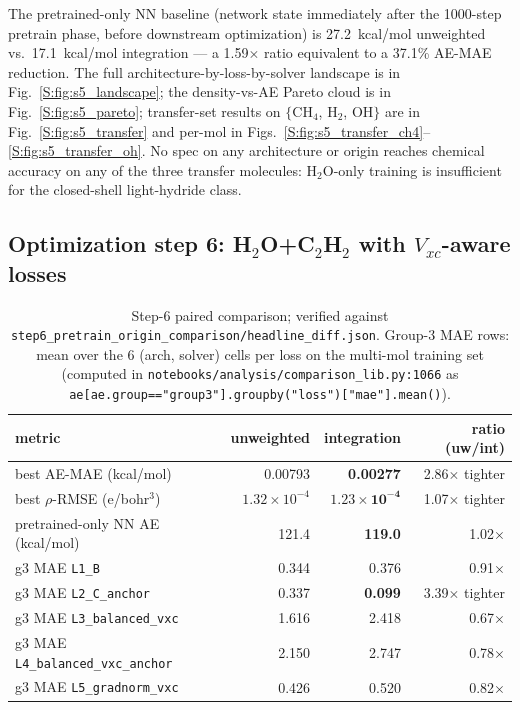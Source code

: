 \documentclass[11pt,letterpaper]{article}
\begin{document}
The pretrained-only NN baseline (network state immediately after the
1000-step pretrain phase, before downstream optimization) is 27.2~kcal/mol
unweighted vs.\ 17.1~kcal/mol integration --- a 1.59$\times$ ratio
equivalent to a 37.1\% AE-MAE reduction. The full architecture-by-loss-by-solver
landscape is in Fig.~\ref{S:fig:s5_landscape}; the density-vs-AE Pareto
cloud is in Fig.~\ref{S:fig:s5_pareto}; transfer-set results on
$\{$CH$_4$, H$_2$, OH$\}$ are in Fig.~\ref{S:fig:s5_transfer} and per-mol
in Figs.~\ref{S:fig:s5_transfer_ch4}--\ref{S:fig:s5_transfer_oh}. No spec
on any architecture or origin reaches chemical accuracy on any of the
three transfer molecules: H$_2$O-only training is insufficient for the
closed-shell light-hydride class.

\subsection{Optimization step 6: H$_2$O+C$_2$H$_2$ with $V_{xc}$-aware losses}
\label{sec:results_step6}

\begin{table}[h]
\centering
\caption{Step-6 paired comparison; verified against
\texttt{step6\_pretrain\_origin\_comparison/headline\_diff.json}.
Group-3 MAE rows: mean over the 6 (arch, solver) cells per loss on the
multi-mol training set (computed in
\texttt{notebooks/analysis/comparison\_lib.py:1066} as
\texttt{ae[ae.group=="group3"].groupby("loss")["mae"].mean()}).}
\label{tab:step6_paired}
\small
\begin{tabular}{lrrr}
\toprule
metric & unweighted & integration & ratio (uw/int) \\
\midrule
best AE-MAE (kcal/mol) & 0.00793 & \textbf{0.00277} & 2.86$\times$ tighter \\
best $\rho$-RMSE (e/bohr$^3$) & $1.32\!\times\!10^{-4}$ & $\mathbf{1.23\!\times\!10^{-4}}$ & 1.07$\times$ tighter \\
pretrained-only NN AE (kcal/mol) & 121.4 & \textbf{119.0} & 1.02$\times$ \\
g3 MAE \texttt{L1\_B} & 0.344 & 0.376 & 0.91$\times$ \\
g3 MAE \texttt{L2\_C\_anchor} & 0.337 & \textbf{0.099} & 3.39$\times$ tighter \\
g3 MAE \texttt{L3\_balanced\_vxc} & 1.616 & 2.418 & 0.67$\times$ \\
g3 MAE \texttt{L4\_balanced\_vxc\_anchor} & 2.150 & 2.747 & 0.78$\times$ \\
g3 MAE \texttt{L5\_gradnorm\_vxc} & 0.426 & 0.520 & 0.82$\times$ \\
\bottomrule
\end{tabular}
\end{table}
\end{document}
